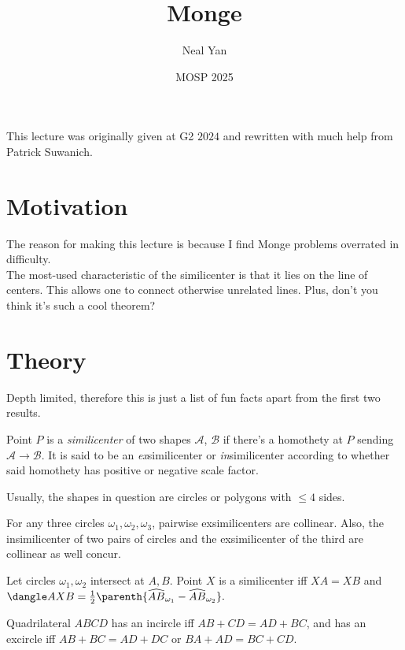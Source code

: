 \documentclass{seto}
\title{Monge}
\author{Neal Yan}
\date{MOSP 2025}
\begin{document}
\maketitle
{}
\begin{remark}[Credits] This lecture was originally given at 
G2 $2024$ and rewritten with much help from Patrick Suwanich. 
\end{remark}
\section{Motivation}
The reason for making this lecture is because 
I find Monge problems overrated in difficulty.\\
The most-used characteristic of the similicenter is that it lies on the line of centers. This allows 
one to connect otherwise unrelated lines. Plus, don't you think it's such a cool theorem? 
\section{Theory}
Depth limited, therefore this is just a list of fun facts apart from the first two results.
\begin{thm}
    Point $P$ is a \emph{similicenter} of two shapes $\mathcal A$, $\mathcal B$ if there's a homothety at 
    $P$ sending $\mathcal A\to\mathcal B$. 
    It is said to be an \emph{ex}similicenter or \emph{in}similicenter according to whether said homothety
    has positive or negative scale factor.
\end{thm}
Usually, the shapes in question are circles or polygons with $\le4$ sides.
\begin{thm}
For any three circles $\omega_1,\omega_2,\omega_3$, pairwise exsimilicenters are collinear.
Also, the insimilicenter of two pairs of circles and 
the exsimilicenter of the third are collinear as well
concur.
\end{thm}
\begin{thm}
Let circles $\omega_1,\omega_2$ intersect at $A,B$. 
Point $X$ is a similicenter iff $XA=XB$ and 
\(\dangle AXB=\frac12\parenth{\widehat{AB}_{\omega_1}-\widehat{AB}_{\omega_2} }.\)
\end{thm}
\begin{thm}
Quadrilateral $ABCD$ has an incircle iff $AB+CD=AD+BC$, and has an excircle iff 
$AB+BC=AD+DC$ or $BA+AD=BC+CD$.
\end{thm}
\end{document}
